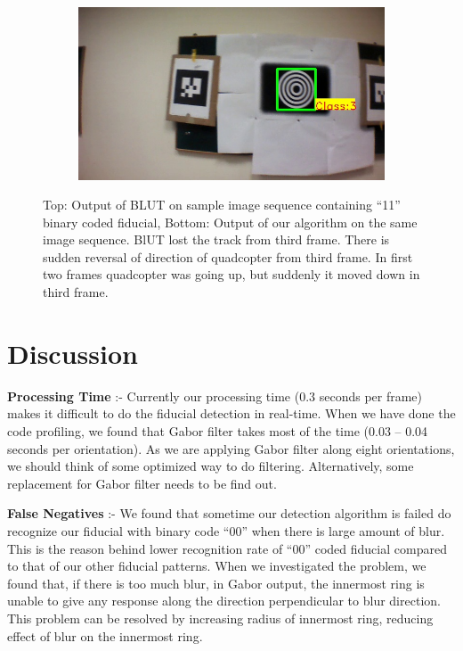 \documentclass[runningheads]{llncs}
\begin{document}
\begin{figure}
\begin{subfigure}[b]{.19\textwidth}
\end{subfigure}
\begin{subfigure}[b]{.19\textwidth}
\includegraphics[width=\linewidth]{BLUT_input_11/output6.jpg}
\end{subfigure}
\caption{Top: Output of BLUT\cite{Wu:2011} on sample image sequence containing
``11'' binary coded fiducial, Bottom: Output of our algorithm on the same image
sequence. BlUT lost the track from third frame. There is sudden reversal of
direction of quadcopter from third frame. In first two frames quadcopter was
going up, but suddenly it moved down in third frame.}
\label{fig:BLUT_compare_11}
\end{figure}

\section{Discussion}

\noindent\textbf{Processing Time} :-  Currently our processing time (0.3 seconds
per frame) makes it difficult to do the fiducial detection in real-time. When we have
done the code profiling, we found that Gabor filter takes most of the time (0.03
-- 0.04 seconds per orientation). As we are applying Gabor filter along eight
orientations, we should think of some optimized way to do filtering.
Alternatively, some replacement for Gabor filter needs to be find out.

\noindent\textbf{False Negatives} :- We found that sometime our detection
algorithm is failed do recognize our fiducial with binary code ``00'' when there is large
amount of blur. This is the reason behind lower recognition rate of ``00''
coded fiducial compared to that of our other fiducial patterns. When we
investigated the problem, we found that, if there is too much blur, in Gabor
output, the innermost ring is unable to give any response along the direction
perpendicular to blur direction. This problem can be resolved by increasing
radius of innermost ring, reducing effect of blur on the innermost ring.
\end{document}
